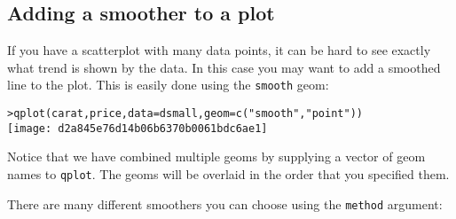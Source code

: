 
\subsection{Adding a smoother to a plot}\label{sub:smooth}

If you have a scatterplot with many data points, it can be hard to see exactly what trend is shown by the data.  In this case you may want to add a smoothed line to the plot.  This is easily done using the {\tt smooth} geom:

\begin{alltt}
> qplot(carat, price, data = dsmall, geom = c("smooth", "point"))
\texttt{[image: d2a845e76d14b06b6370b0061bdc6ae1]}

\end{alltt}

Notice that we have combined multiple geoms by supplying a vector of geom names to {\tt qplot}.  The geoms will be overlaid in the order that you specified them.

There are many different smoothers you can choose using the {\tt method} argument:

